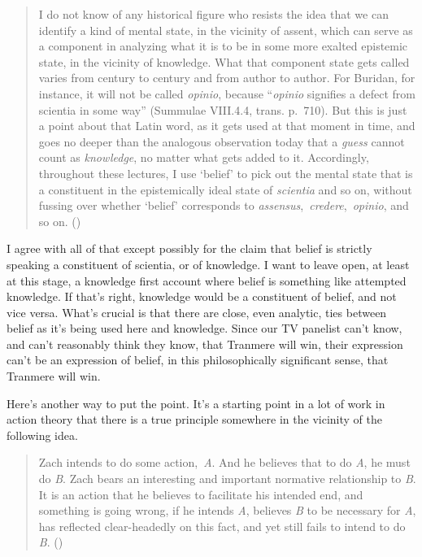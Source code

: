 \documentclass[
  10pt,
  letterpaper,
  twoside]{scrbook}
\begin{document}
\begin{quote}
I do not know of any historical figure who resists the idea that we can
identify a kind of mental state, in the vicinity of assent, which can
serve as a component in analyzing what it is to be in some more exalted
epistemic state, in the vicinity of knowledge. What that component state
gets called varies from century to century and from author to author.
For Buridan, for instance, it will not be called \emph{opinio}, because
``\emph{opinio} signifies a defect from scientia in some way'' (Summulae
VIII.4.4, trans. p.~710). But this is just a point about that Latin
word, as it gets used at that moment in time, and goes no deeper than
the analogous observation today that a \emph{guess} cannot count as
\emph{knowledge}, no matter what gets added to it. Accordingly,
throughout these lectures, I use `belief' to pick out the mental state
that is a constituent in the epistemically ideal state of
\emph{scientia} and so on, without fussing over whether `belief'
corresponds to \emph{assensus},~\emph{credere},~\emph{opinio}, and so
on. ()
\end{quote}

I agree with all of that except possibly for the claim that belief is
strictly speaking a constituent of scientia, or of knowledge. I want to
leave open, at least at this stage, a knowledge first account where
belief is something like attempted knowledge. If that's right, knowledge
would be a constituent of belief, and not vice versa. What's crucial is
that there are close, even analytic, ties between belief as it's being
used here and knowledge. Since our TV panelist can't know, and can't
reasonably think they know, that Tranmere will win, their expression
can't be an expression of belief, in this philosophically significant
sense, that Tranmere will win.

Here's another way to put the point. It's a starting point in a lot of
work in action theory that there is a true principle somewhere in the
vicinity of the following idea.

\begin{quote}
Zach intends to do some action,~\emph{A}. And he believes that to do
\emph{A}, he must do \emph{B}. Zach bears an interesting and important
normative relationship to \emph{B}. It is an action that he believes to
facilitate his intended end, and something is going wrong, if he intends
\emph{A}, believes \emph{B} to be necessary for \emph{A}, has reflected
clear-headedly on this fact, and yet still fails to intend to do
\emph{B}. ()
\end{quote}
\end{document}
